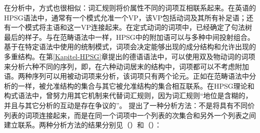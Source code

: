 在\hpsgc 分析\indexhpsgc 中，方式也很相似：词汇规则将价属性不同的词项互相联系起来。在英语的HPSG语法中，通常有一个模式允准一个VP，该VP包括动词及其所有补足语；还有一个模式将主语和这一VP连接起来\citep[]{ps2}。在定式动词的词项中，已经确定了句法树最后的样子。与在范畴语法中一样，HPSG中的附加语可以与多种中间投射组合。基于在特定语法中使用的统制模式，词项会决定能够出现的成分结构和允许出现的多重结构。在第\ref{Kapitel-HPSG}章提出的德语语法中，可以使用双及物动词的词项来分析六种不同的序列，即，在六种动词居末的结构中，词项都可以不考虑附加语。两种序列可以用被动词项来分析，该词项只有两个论元。正如在范畴语法中分析的一样，被允准结构的集合与其它被允准结构的集合相互联系。在HPSG理论和构式语法中，曾努力用其它机制来代替词汇规则，因为词汇规则“地位是含糊的，并且与其它分析的互动是存在争议的”\citep*[]{BMS2001a}。 \citet{BMS2001a} 提出了一种分析方法：不是将具有不同价列表的词项连接起来，而是在同一个词项中一个列表的次集合和另外一个列表之间建立联系。两种分析方法的结果分别见（）和（）：
